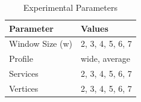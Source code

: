     \begin{table}
      \caption{Experimental Parameters}
      \label{tab:parameters}
      \centering
      {\color{OurColor2}
        \begin{tabular}{l|l}
          \textbf{Parameter}                  & \textbf{Values}  \\
          \hline
          Window Size (\textbar{}w\textbar{}) & 2, 3, 4, 5, 6, 7 \\
          Profile                             & wide, average    \\
          Services                            & 2, 3, 4, 5, 6, 7 \\
          Vertices                            & 2, 3, 4, 5, 6, 7 \\
        \end{tabular}
      }
    \end{table}

